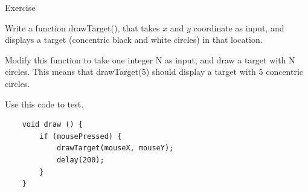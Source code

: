 \begin{frame}[fragile]{Exercise}{}
    \large
    \begin{block}{}
    Write a function drawTarget(), that takes $x$ and $y$ coordinate as input,
    and displays a target (concentric black and white circles) in that location.
    \end{block}
    \begin{block}{}
    Modify this function to take one integer N as input, and draw a target with N circles.
    This means that drawTarget(5) should display a target with 5 concentric circles.
    \end{block}
    \begin{block}{}
        Use this code to test.
        \begin{verbatim}
    void draw () {
        if (mousePressed) {
            drawTarget(mouseX, mouseY);
            delay(200);
        }
    }
        \end{verbatim}
    \end{block}
\end{frame}
